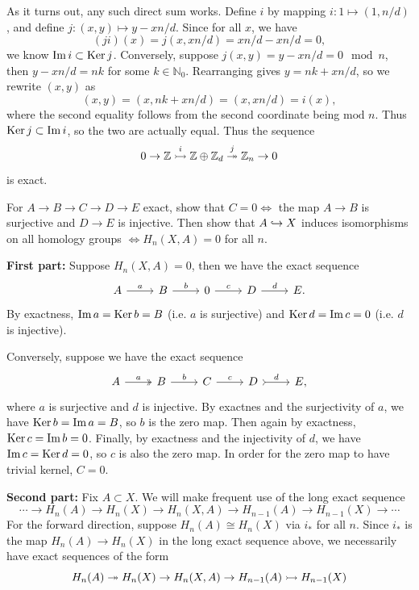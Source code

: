 \documentclass[twoside,10pt]{article}
\begin{document}
\begin{enumerate}
		As it turns out, any such direct sum works. Define $i$ by mapping $i:1\mapsto (1,n/d)$, and define $j:(x,y) \mapsto y-xn/d$. Since for all $x$, we have
		\[
			(ji)(x) = j(x,xn/d) = xn/d - xn/d = 0,
		\] we know $\operatorname{Im} i \subset \operatorname{Ker} j$. Conversely, suppose $j(x,y) = y-xn/d=0 \mod n$, then $y-xn/d = nk$ for some $k \in \mathbb{N}_{0}$. Rearranging gives $y=nk+xn/d$, so we rewrite $(x,y)$ as
		\[
			(x,y) = (x,nk+xn/d) = (x,xn/d) = i(x),
		\] where the second equality follows from the second coordinate being $\text{mod } n$. Thus $\operatorname{Ker} j \subset \operatorname{Im} i$, so the two are actually equal. Thus the sequence
		\[
		0 \to \mathbb{Z} \stackrel{i}{\rightarrowtail} \mathbb{Z}\oplus \mathbb{Z}_{d} \stackrel{j}{\twoheadrightarrow} \mathbb{Z}_{n}\to 0
		\] is exact.
\end{enumerate}

\newpage

\begin{exer}[2.1: 15]
	For $A\to B\to C\to D\to E$ exact, show that $C=0 \iff$ the map $A\to B$ is surjective and $D\to E$ is injective. Then show that $A\hookrightarrow X$ induces isomorphisms on all homology groups $\iff H_{n}(X,A)=0$ for all $n$.
\end{exer}

\textbf{First part:} Suppose $H_{n}(X,A)=0$, then we have the exact sequence
\[
\begin{tikzcd}
	A \rar{a} & B \rar{b} & 0 \rar{c} & D \rar{d} & E.
\end{tikzcd}
\] By exactness, $\operatorname{Im} a = \operatorname{Ker} b=B$ (i.e. $a$ is surjective) and $\operatorname{Ker} d=\operatorname{Im} c = 0$ (i.e. $d$ is injective).

Conversely, suppose we have the exact sequence
\[
	\begin{tikzcd}
		A \rar[two heads]{a} & B \rar{b} & C \rar{c} & D \rar[tail]{d} & E,
	\end{tikzcd}
\] where $a$ is surjective and $d$ is injective. By exactnes and the surjectivity of $a$, we have $\operatorname{Ker} b = \operatorname{Im} a = B$, so $b$ is the zero map. Then again by exactness, $\operatorname{Ker}  c = \operatorname{Im} b = 0$. Finally, by exactness and the injectivity of $d$, we have $\operatorname{Im} c = \operatorname{Ker} d=0$, so $c$ is also the zero map. In order for the zero map to have trivial kernel, $C=0$.

\textbf{Second part:} Fix $A \subset X$. We will make frequent use of the long exact sequence
\[
	\cdots \to H_{n}(A) \to H_{n}(X) \to H_{n}(X,A) \to H_{n-1}(A) \to H_{n-1}(X) \to \cdots
\] For the forward direction, suppose $H_{n}(A) \cong H_{n}(X)$ via $i_{*}$ for all $n$. Since $i_{*}$ is the map $H_{n}(A) \to H_{n}(X)$ in the long exact sequence above, we necessarily have exact sequences of the form
\[
	H_{n}(A) \twoheadrightarrow H_{n}(X) \to H_{n}(X,A) \to H_{n-1}(A) \rightarrowtail H_{n-1}(X)
\]
\end{document}
